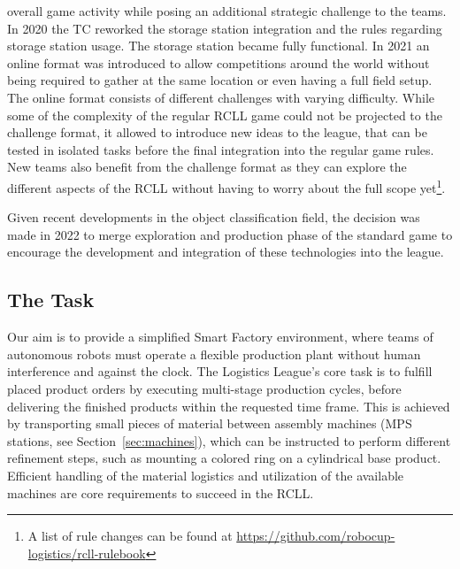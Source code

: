 \documentclass[12pt,twoside]{article}
\newcommand{\refsec}[1]{Section~\ref{#1}}
\begin{document}
 overall game activity while posing an additional strategic challenge to the
 teams.
 In 2020 the \ac{TC} reworked the storage station integration and the rules
 regarding storage station usage. The storage station became fully functional.
 In 2021 an online format was introduced to allow competitions around the
 world without being required to gather at the same location or even having
 a full field setup.
 The online format consists of different challenges with varying difficulty.
 While some of the complexity of the regular \ac{RCLL} game could not be
 projected to the challenge format,
 it allowed to introduce new ideas to the league,
 that can be tested in isolated tasks before the final integration into
 the regular game rules.
 New teams also benefit from the challenge format as they can explore the
 different aspects of the \ac{RCLL} without having to worry about the full scope
 yet\footnote{A list of rule changes can be found at
 \mbox{\url{https://github.com/robocup-logistics/rcll-rulebook}}}.

 Given recent developments in the object classification field, the
 decision was made in 2022 to merge exploration and production phase of the
 standard game to encourage the development and integration of these
 technologies into the league.

\subsection{The Task}
\label{sec:task}
 Our aim is to provide a simplified Smart Factory environment, where
 teams of autonomous robots must operate a flexible production plant without
 human interference and against the clock.
 The Logistics League's core task is to fulfill placed product orders by
 executing multi-stage production cycles, before delivering the finished
 products within the requested time frame.
 This is achieved by transporting small pieces of material between assembly
 machines (\ac{MPS} stations, see \refsec{sec:machines}),
 which can be instructed to perform different refinement steps,
 such as mounting a colored ring on a cylindrical base product.
 Efficient handling of the material logistics and utilization of the available
 machines are core requirements to succeed in the \ac{RCLL}.
\end{document}
